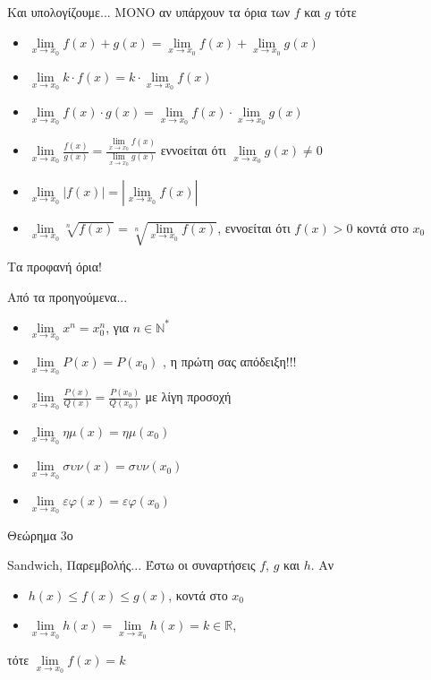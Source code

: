 \documentclass[greek]{beamer}
\begin{document}
\begin{frame}{Και υπολογίζουμε...}
 ΜΟΝΟ αν υπάρχουν τα όρια των $f$ και $g$ τότε
 \begin{itemize}
  \item $\lim\limits_{x \to x_0}{ f(x)+g(x) }=\lim\limits_{x \to x_0}{ f(x) }+\lim\limits_{x \to x_0}{ g(x) }$
  \item $\lim\limits_{x \to x_0}{ k\cdot f(x) }=k\cdot \lim\limits_{x \to x_0}{ f(x) }$
  \item $\lim\limits_{x \to x_0}{ f(x)\cdot g(x) }=\lim\limits_{x \to x_0}{ f(x) }\cdot\lim\limits_{x \to x_0}{ g(x) }$
  \item $\lim\limits_{x \to x_0}{ \frac{f(x)}{g(x)} }=\frac{\lim\limits_{x \to x_0}{ f(x) }}{\lim\limits_{x \to x_0}{ g(x) }}$ εννοείται ότι $\lim\limits_{x \to x_0}{ g(x) }\ne 0$
  \item $\lim\limits_{x \to x_0}{ |f(x)| }=|\lim\limits_{x \to x_0}{ f(x) }|$
  \item $\lim\limits_{x \to x_0}{ \sqrt[n]{f(x)} }=\sqrt[n]{\lim\limits_{x \to x_0}{ f(x) }}$, εννοείται ότι $f(x)>0$ κοντά στο $x_0$
 \end{itemize}
\end{frame}

\begin{frame}{Τα προφανή όρια!}
 \begin{block}{Από τα προηγούμενα...}
  \begin{itemize}
   \item $\lim\limits_{x \to x_0}{ x^n }=x_0^n$, για $n\in \mathbb{N}^*$ \pause
   \item $\lim\limits_{x \to x_0}{ P(x) }=P(x_0)$ \pause, η πρώτη σας απόδειξη!!! \pause
   \item $\lim\limits_{x \to x_0}{ \frac{P(x)}{Q(x)} }=\frac{P(x_0)}{Q(x_0)}$ \pause με λίγη προσοχή \pause
   \item $\lim\limits_{x \to x_0}{ ημ(x) }=ημ(x_0)$ \pause
   \item $\lim\limits_{x \to x_0}{ συν(x) }=συν(x_0)$ \pause
   \item $\lim\limits_{x \to x_0}{ εφ(x) }=εφ(x_0)$
  \end{itemize}
 \end{block}
\end{frame}

\begin{frame}{Θεώρημα 3ο}
 \begin{block}{Sandwich, Παρεμβολής...}
  Έστω οι συναρτήσεις $f$, $g$ και $h$. Αν
  \begin{itemize}
   \item $h(x)\le f(x) \le g(x)$, κοντά στο $x_0$ \pause
   \item $\lim\limits_{x \to x_0}{ h(x) }=\lim\limits_{x \to x_0}{ h(x) }=k \in\mathbb{R}$, \pause
  \end{itemize}
  τότε $\lim\limits_{x \to x_0}{ f(x) }=k$
 \end{block}
\end{frame}
\end{document}
